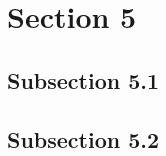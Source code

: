 \section{Section 5}
\subsection{Subsection 5.1}
\subsection{Subsection 5.2}

\label{sec:conclusion}

